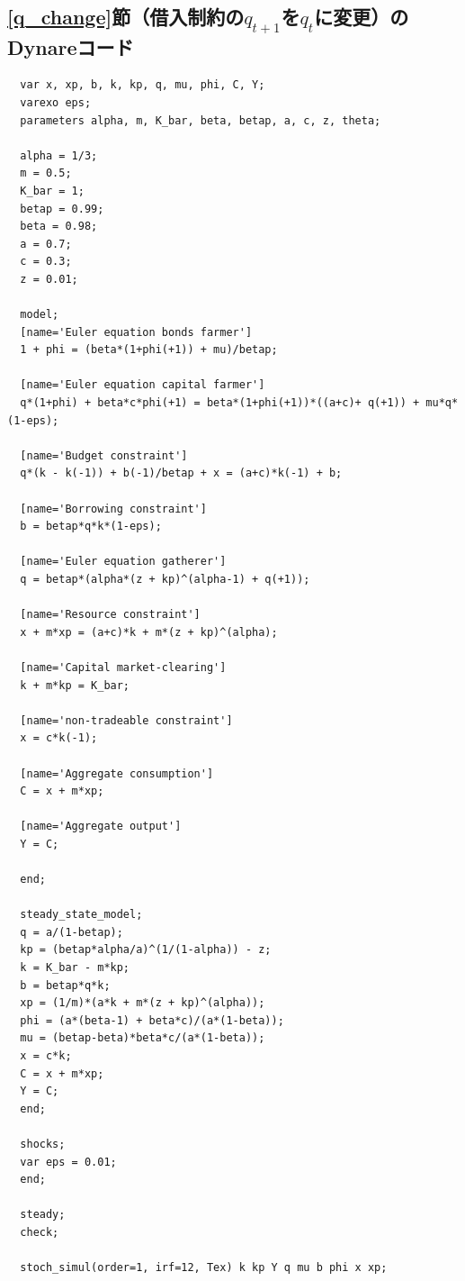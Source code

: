 \documentclass[dvipdfmx]{jlreq}
\begin{document}
\subsection*{\ref{q_change}節（借入制約の$q_{t+1}$を$q_t$に変更）のDynareコード}
\begin{lstlisting}
  var x, xp, b, k, kp, q, mu, phi, C, Y;
  varexo eps;
  parameters alpha, m, K_bar, beta, betap, a, c, z, theta;
  
  alpha = 1/3;
  m = 0.5;
  K_bar = 1;
  betap = 0.99;
  beta = 0.98;
  a = 0.7;
  c = 0.3;
  z = 0.01;
  
  model;
  [name='Euler equation bonds farmer']
  1 + phi = (beta*(1+phi(+1)) + mu)/betap;
  
  [name='Euler equation capital farmer']
  q*(1+phi) + beta*c*phi(+1) = beta*(1+phi(+1))*((a+c)+ q(+1)) + mu*q*(1-eps);
  
  [name='Budget constraint']
  q*(k - k(-1)) + b(-1)/betap + x = (a+c)*k(-1) + b;
  
  [name='Borrowing constraint']
  b = betap*q*k*(1-eps);
  
  [name='Euler equation gatherer']
  q = betap*(alpha*(z + kp)^(alpha-1) + q(+1));
  
  [name='Resource constraint']
  x + m*xp = (a+c)*k + m*(z + kp)^(alpha);
  
  [name='Capital market-clearing']
  k + m*kp = K_bar;
  
  [name='non-tradeable constraint']
  x = c*k(-1);
  
  [name='Aggregate consumption']
  C = x + m*xp;
  
  [name='Aggregate output']
  Y = C;  
  
  end;
  
  steady_state_model;
  q = a/(1-betap);
  kp = (betap*alpha/a)^(1/(1-alpha)) - z;
  k = K_bar - m*kp;
  b = betap*q*k;
  xp = (1/m)*(a*k + m*(z + kp)^(alpha));
  phi = (a*(beta-1) + beta*c)/(a*(1-beta));
  mu = (betap-beta)*beta*c/(a*(1-beta));
  x = c*k;
  C = x + m*xp;
  Y = C;
  end;
  
  shocks;
  var eps = 0.01;
  end;

  steady;
  check;

  stoch_simul(order=1, irf=12, Tex) k kp Y q mu b phi x xp;
\end{lstlisting}
\end{document}
